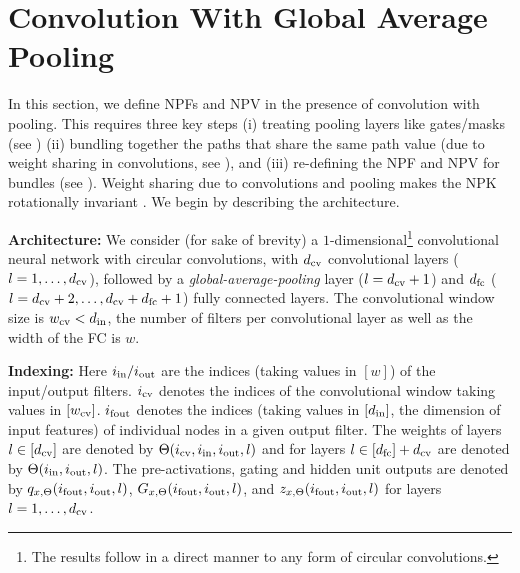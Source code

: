 
\section{Convolution With Global Average Pooling}\label{sec:conv}
In this section, we define NPFs and NPV in the presence of convolution with pooling. This requires three key steps (i) treating pooling layers like gates/masks (see ) (ii) bundling together the paths that share the same path value
(due to weight sharing in convolutions, see ),  and (iii) re-defining the NPF and NPV for bundles (see ). Weight sharing due to convolutions and pooling makes the NPK rotationally invariant . We begin by describing the architecture.

\textbf{Architecture:} We consider (for sake of brevity) a $1$-dimensional\footnote{The results follow in a direct manner to any form of circular convolutions.} convolutional neural network with circular convolutions, with $d_{\text{cv}}$ convolutional layers ($l=1,\ldots,d_{\text{cv}}$), followed by a \emph{global-average-pooling} layer ($l=d_{\text{cv}}+1$) and $d_{\text{fc}}$ ($l=d_{\text{cv}}+2,\ldots,d_{\text{cv}}+d_{\text{fc}}+1$) fully connected  layers. The convolutional window size is $w_{\text{cv}}<d_{\text{in}}$, the number of filters per convolutional layer as well as the width of the FC is $w$. 

\textbf{Indexing:} Here $i_{\text{in}}/i_{\text{out}}$ are the indices (taking values in $[w]$) of the input/output filters. $i_{\text{cv}}$ denotes the indices of the convolutional window taking values in $[w_{\text{cv}}]$. $i_{\text{fout}}$ denotes the indices (taking values in $[d_{\text{in}}]$, the dimension of input features) of individual nodes in a given output filter. The weights of layers $l\in[d_{\text{cv}}]$ are denoted by $\Theta(i_{\text{cv}},i_{\text{in}},i_{\text{out}},l)$ and for layers $l\in[d_{\text{fc}}]+d_{\text{cv}}$ are denoted by $\Theta(i_{\text{in}},i_{\text{out}},l)$. The pre-activations, gating and hidden unit outputs are denoted by $q_{x,\Theta}(i_{\text{fout}},i_{\text{out}},l)$,  $G_{x,\Theta}(i_{\text{fout}},i_{\text{out}},l)$, and $z_{x,\Theta}(i_{\text{fout}},i_{\text{out}},l)$ for layers $l=1,\ldots, d_{\text{cv}}$.

